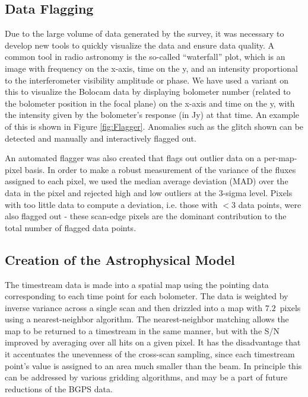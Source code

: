\documentclass{emulateapj}
\begin{document}
\subsection{Data Flagging}

Due to the large volume of data generated by the survey, it was
necessary to develop new tools to quickly visualize the data and
ensure data quality.  A common tool in radio astronomy is the
so-called ``waterfall'' plot, which is an image with frequency on the
x-axis, time on the y, and an intensity proportional to the
interferometer visibility amplitude or phase.  We have used a variant
on this to visualize the Bolocam data by displaying bolometer number
(related to the bolometer position in the focal plane) on the x-axis
and time on the y, with the intensity given by the bolometer's
response (in Jy) at that time.  An example of this is shown in Figure
\ref{fig:Flagger}.  Anomalies such as the glitch shown
can be detected and manually and interactively flagged out.

An automated flagger was also created that flags out outlier data on a
per-map-pixel basis.  In order to make a robust measurement of the
variance of the fluxes assigned to each pixel, we used the median
average deviation (MAD) over the data in the pixel and rejected high and low
outliers at the 3-sigma level.  Pixels with too little data to compute
a deviation, i.e. those with $<3$ data points, were also flagged out -
these scan-edge pixels are the dominant contribution to the total
number of flagged data points.

\subsection{Creation of the Astrophysical Model}

The timestream data is made into a spatial map using the pointing data
corresponding to each time point for each bolometer.  The data is
weighted by inverse variance across a single scan and then drizzled
into a map with $7.2$\arcsec\ pixels using a nearest-neighbor
algorithm.  The nearest-neighbor matching allows the map to be
returned to a timestream in the same manner, but with the S/N improved
by averaging over all hits on a given pixel.  It has the disadvantage
that it accentuates the unevenness of the cross-scan sampling, since
each timestream point's value is assigned to an area much smaller than
the beam.  In principle this can be addressed by various gridding
algorithms, and may be a part of future reductions of the BGPS data.
\end{document}
